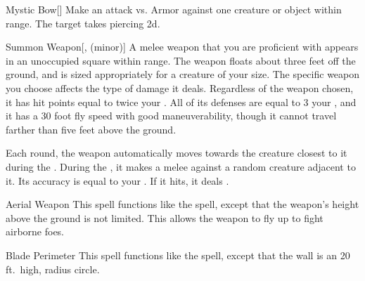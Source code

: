\lowercase{\hypertarget{spell:Mystic Bow}{}}\label{spell:Mystic Bow}
\begin{ability}[\nth{1}]{\hypertarget{spell:Mystic Bow}{Mystic Bow}}[]
Make an attack vs. Armor against one creature or object within \rngmed range.
\hit The target takes piercing  \plus2d.
\end{ability}
\vspace{0.25em}



\lowercase{\hypertarget{spell:Summon Weapon}{}}\label{spell:Summon Weapon}
\begin{ability}[\nth{1}]{\hypertarget{spell:Summon Weapon}{Summon Weapon}}[,  (minor)]
A melee weapon that you are proficient with appears in an unoccupied square within \rngmed range.
The weapon floats about three feet off the ground, and is sized appropriately for a creature of your size.
The specific weapon you choose affects the type of damage it deals.
Regardless of the weapon chosen, it has hit points equal to twice your .
All of its defenses are equal to 3 \add your , and it has a 30 foot fly speed with good maneuverability, though it cannot travel farther than five feet above the ground.

Each round, the weapon automatically moves towards the creature closest to it during the .
During the , it makes a melee  against a random creature adjacent to it.
Its accuracy is equal to your .
If it hits, it deals .
\end{ability}
\vspace{0.25em}



\lowercase{\hypertarget{spell:Aerial Weapon}{}}\label{spell:Aerial Weapon}
\begin{ability}[\nth{2}]{\hypertarget{spell:Aerial Weapon}{Aerial Weapon}}
This spell functions like the  spell, except that the weapon's height above the ground is not limited.
This allows the weapon to fly up to fight airborne foes.
\end{ability}
\vspace{0.25em}



\lowercase{\hypertarget{spell:Blade Perimeter}{}}\label{spell:Blade Perimeter}
\begin{ability}[\nth{2}]{\hypertarget{spell:Blade Perimeter}{Blade Perimeter}}
This spell functions like the  spell, except that the wall is an 20 ft.\ high, \areamed radius circle.
\end{ability}
\vspace{0.25em}



